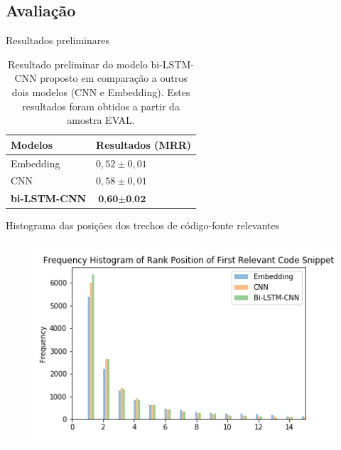 \documentclass[10pt]{beamer}
\begin{document}
\subsection{Avaliação}
\begin{frame}{Resultados preliminares}
  \begin{table}[h]
\centering
\begin{tabular}{ p{3cm} p{3cm} }
 \hline
 \textbf{Modelos} & \textbf{Resultados (MRR)}\\
 \hline
 Embedding & $0,52 \pm 0,01$\\
 
 CNN & $0,58 \pm 0,01 $ \\
 
 \textbf{bi-LSTM-CNN} & $\textbf{0,60} \pm \textbf{0,02}$\\
 \hline
\end{tabular}
\caption{Resultado preliminar do modelo bi-LSTM-CNN proposto em comparação a outros dois modelos (CNN e Embedding). Estes resultados foram obtidos a partir da amostra EVAL.}
\label{table:resultados-preliminares}
\end{table}
\end{frame}

\begin{frame}{Histograma das posições dos trechos de código-fonte relevantes}
  \begin{figure}[h]
    \centering
    \includegraphics[width=1\textwidth]{histogram_results.png}
    \label{fig:histogram-results}
\end{figure}
\end{frame}
\end{document}
